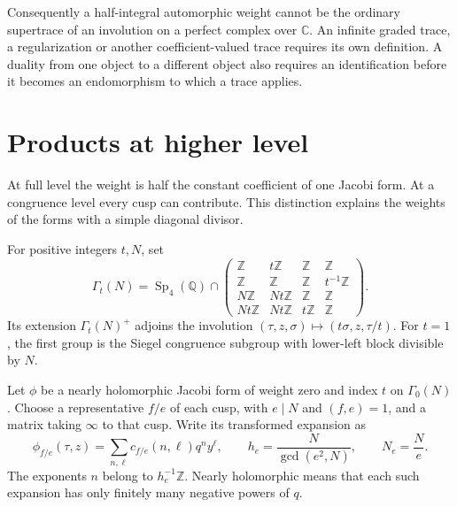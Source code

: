 Consequently a half-integral automorphic weight cannot
be the ordinary supertrace of an involution on a perfect
complex over \(\mathbb C\). An infinite graded trace,
a regularization or another coefficient-valued trace
requires its own definition. A duality from one object
to a different object also requires an identification
before it becomes an endomorphism to which a trace applies.

\section{Products at higher level}
\label{cyidx:sec:families}

At full level the weight is half the constant coefficient
of one Jacobi form. At a congruence level every cusp can
contribute. This distinction explains the weights of the
forms with a simple diagonal divisor.

For positive integers \(t,N\), set
\[
 \Gamma_t(N)=\operatorname{Sp}_4(\mathbb Q)\cap
 \begin{pmatrix}
 \mathbb Z&t\mathbb Z&\mathbb Z&\mathbb Z\\
 \mathbb Z&\mathbb Z&\mathbb Z&t^{-1}\mathbb Z\\
 N\mathbb Z&Nt\mathbb Z&\mathbb Z&\mathbb Z\\
 Nt\mathbb Z&Nt\mathbb Z&t\mathbb Z&\mathbb Z
 \end{pmatrix}.
\]
Its extension \(\Gamma_t(N)^+\) adjoins the involution
\((\tau,z,\sigma)\mapsto(t\sigma,z,\tau/t)\).
For \(t=1\), the first group is the Siegel congruence
subgroup with lower-left block divisible by \(N\).

Let \(\phi\) be a nearly holomorphic Jacobi form of
weight zero and index \(t\) on \(\Gamma_0(N)\).
Choose a representative \(f/e\) of each cusp, with
\(e\mid N\) and \((f,e)=1\), and a matrix taking
\(\infty\) to that cusp. Write its transformed expansion as
\[
 \phi_{f/e}(\tau,z)=\sum_{n,\ell}c_{f/e}(n,\ell)q^ny^\ell,
 \qquad h_e=\frac{N}{\gcd(e^2,N)},\qquad N_e=\frac Ne.
\]
The exponents \(n\) belong to \(h_e^{-1}\mathbb Z\).
Nearly holomorphic means that each such expansion has
only finitely many negative powers of \(q\).

